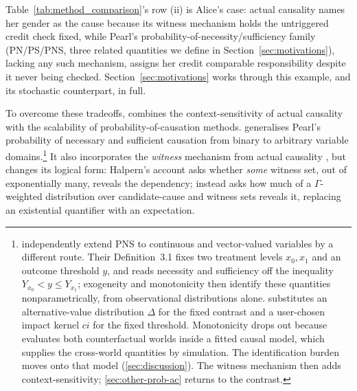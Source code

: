 Table~\ref{tab:method_comparison}'s row (ii) is Alice's case: actual
causality names her gender as the cause because its witness mechanism holds the
untriggered credit check fixed, while Pearl's probability-of-necessity/sufficiency
family (PN/PS/PNS, three related quantities we define in
Section~\ref{sec:motivations}), lacking any such mechanism, assigns her credit
comparable responsibility despite it never being checked.
Section~\ref{sec:motivations} works through this example, and its stochastic
counterpart, in full.

To overcome these tradeoffs, \Ourapproach combines the context-sensitivity of actual
causality with the scalability of probability-of-causation methods. \Ourapproach
generalises Pearl's probability of necessary and sufficient causation
\citep{pearl2022probabilities} from binary to arbitrary variable
domains.\footnote{\citet{kawakammi_2024_poc_for_cont_and_vec} independently extend PNS to
continuous and vector-valued variables by a different route. Their
Definition~3.1 fixes two treatment levels $x_0,x_1$ and an outcome threshold $y$,
and reads necessity and sufficiency off the inequality $Y_{x_0} < y \le Y_{x_1}$;
exogeneity and monotonicity then identify these quantities nonparametrically, from
observational distributions alone. \Ourapproach substitutes an alternative-value
distribution $\Delta$ for the fixed contrast and a user-chosen impact kernel $ci$
for the fixed threshold. Monotonicity drops out because \ourapproach evaluates
both counterfactual worlds inside a fitted causal model, which supplies the
cross-world quantities by simulation. The identification burden moves onto that
model (\cref{sec:discussion}). The witness mechanism then adds
context-sensitivity; \cref{sec:other-prob-ac} returns to the contrast.}
It also incorporates the \emph{witness} mechanism from actual causality
\citep{actualCausalityHalpern}, but changes its logical form: Halpern's account asks
whether \emph{some} witness set, out of exponentially many, reveals the dependency;
\ourapproach instead asks how much of a $\Gamma$-weighted distribution over
candidate-cause and witness sets reveals it, replacing an existential quantifier
with an expectation.%
